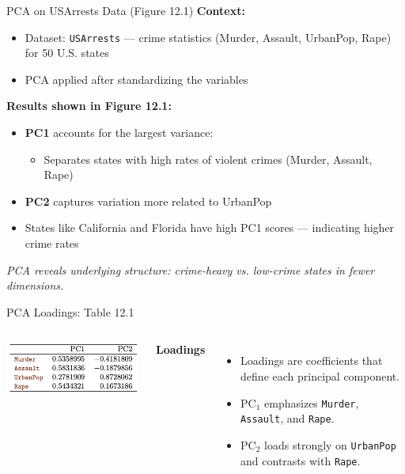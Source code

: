 \documentclass[aspectratio=169,xcolor=dvipsnames]{beamer}
\begin{document}
\begin{frame}{PCA on USArrests Data (Figure 12.1)}
  \textbf{Context:}
  \begin{itemize}
    \item Dataset: \texttt{USArrests} — crime statistics (Murder, Assault, UrbanPop, Rape) for 50 U.S. states
    \item PCA applied after standardizing the variables
  \end{itemize}

  \vspace{0.3cm}
  \textbf{Results shown in Figure 12.1:}
  \begin{itemize}
    \item \textbf{PC1} accounts for the largest variance:
    \begin{itemize}
      \item Separates states with high rates of violent crimes (Murder, Assault, Rape)
    \end{itemize}
    \item \textbf{PC2} captures variation more related to UrbanPop
    \item States like California and Florida have high PC1 scores — indicating higher crime rates
  \end{itemize}

  \vspace{0.3cm}
  \textit{PCA reveals underlying structure: crime-heavy vs. low-crime states in fewer dimensions.}
\end{frame}

\begin{frame}{PCA Loadings: Table 12.1}
  \begin{columns}
    \includegraphics[width=\linewidth]{images/table12_1.png} %

    \textbf{Loadings}
    \begin{itemize}
      \item Loadings are coefficients that define each principal component.
      \item PC$_1$ emphasizes \texttt{Murder}, \texttt{Assault}, and \texttt{Rape}.
      \item PC$_2$ loads strongly on \texttt{UrbanPop} and contrasts with \texttt{Rape}.
    \end{itemize}
    
  \end{columns}
\end{frame}
\end{document}
